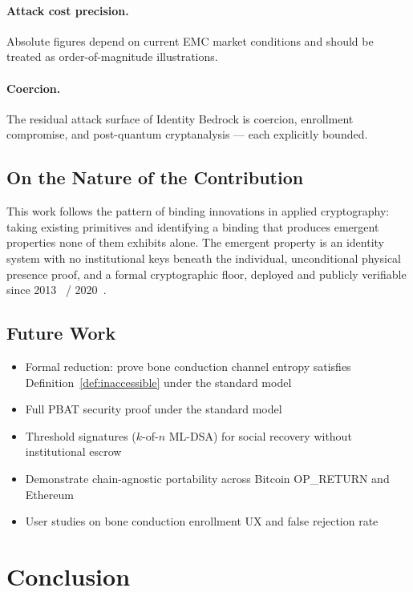 \documentclass[11pt,a4paper]{article}
\theoremstyle{definition}
\newcommand{\PBAT}{\textsf{PBAT}}
\newcommand{\BD}{\textsf{Identity Bedrock}}
\begin{document}
\paragraph{Attack cost precision.}
Absolute figures depend on current EMC market conditions and should
be treated as order-of-magnitude illustrations.

\paragraph{Coercion.}
The residual attack surface of \BD{} is coercion, enrollment
compromise, and post-quantum cryptanalysis --- each explicitly
bounded.

\subsection{On the Nature of the Contribution}

This work follows the pattern of binding innovations in applied
cryptography: taking existing primitives and identifying a binding
that produces emergent properties none of them exhibits alone. The
emergent property is an identity system with no institutional keys
beneath the individual, unconditional physical presence proof, and a
formal cryptographic floor, deployed and publicly verifiable since
2013~\cite{Emercoin} / 2020~\cite{DPO}.

\subsection{Future Work}

\begin{itemize}
  \item Formal reduction: prove bone conduction channel entropy
        satisfies Definition~\ref{def:inaccessible} under the
        standard model
  \item Full \PBAT{} security proof under the standard model
  \item Threshold signatures ($k$-of-$n$ ML-DSA) for social
        recovery without institutional escrow
  \item Demonstrate chain-agnostic portability across Bitcoin
        OP\_RETURN and Ethereum
  \item User studies on bone conduction enrollment UX and false
        rejection rate
\end{itemize}

\section*{Conclusion}
\end{document}
